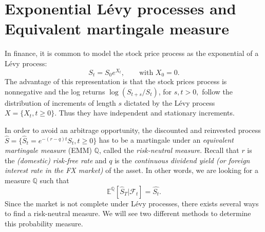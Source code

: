 \section{Exponential L\'evy processes and Equivalent martingale measure}
\label{sec:Levy:exponential_processes}

In finance, it is common to model the stock price process as the exponential of a L\'evy process:
$$S_t = S_0 e^{X_t}, \qquad \text{with }X_0=0.$$
The advantage of this representation is that the stock prices process is nonnegative and the log returns $\log(S_{t+s}/S_t)$, for $s,t>0,$ follow the distribution of increments of length $s$ dictated by the L\'evy process $X=\{X_t,t\geq0\}$. Thus they have independent and stationary increments.

In order to avoid an arbitrage opportunity, the discounted and reinvested process $\hat{S}=\{\hat{S}_t = e^{-(r-q)t}S_t,t\geq0\}$ has to be a martingale under an \textit{equivalent martingale measure} (EMM) $\mathbb{Q}$, called the \textit{risk-neutral measure}. Recall that $r$ is the \textit{(domestic) risk-free rate} and $q$ is the \textit{continuous dividend yield (or foreign interest rate in the FX market)} of the asset. In other words, we are looking for a measure $\mathbb{Q}$ such that
$$\mathbb{E}^\mathbb{Q}\left[\hat{S}_T|\mathcal{F}_t\right]=\hat{S_t}.$$
Since the market is not complete under L\'evy processes, there exists several ways to find a risk-neutral measure. We will see two different methods to determine this probability measure.

